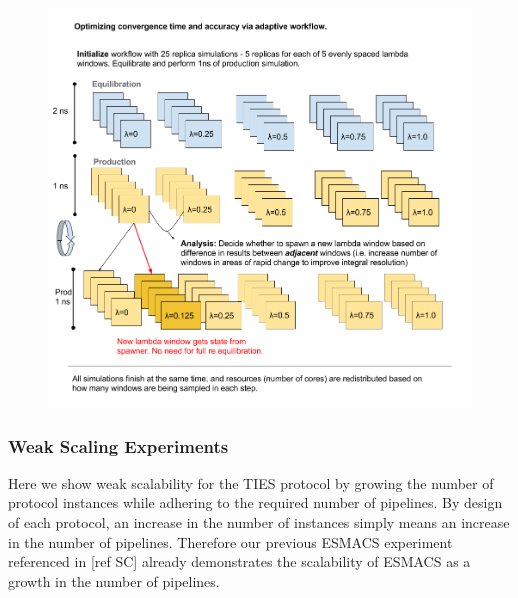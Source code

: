 \begin{figure}
  \centering
   \includegraphics[width=\columnwidth]{figures/Adaptive_TIES.png}
  \caption{}
\label{fig:adaptive_TIES}
\end{figure}

\subsubsection{Weak Scaling Experiments}


Here we show weak scalability for the TIES protocol by growing the number of
protocol instances while adhering to the required number of pipelines. By
design of each protocol, an increase in the number of instances simply means
an increase in the number of pipelines. Therefore our previous ESMACS
experiment referenced in [ref SC] already demonstrates the scalability of
ESMACS as a growth in the number of pipelines.

